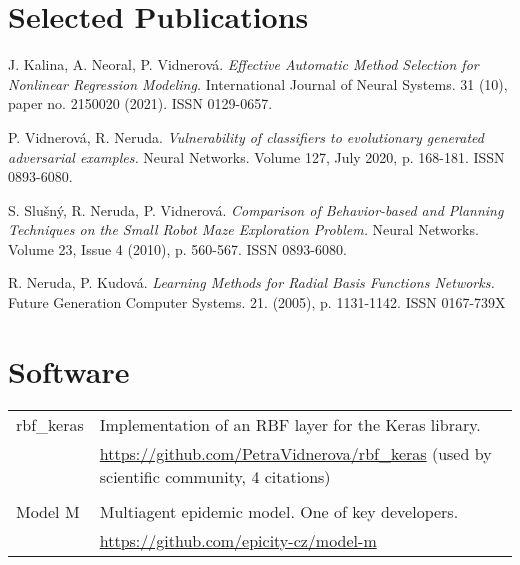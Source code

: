 \documentclass[a4paper, oneside, final]{scrartcl} %
\newcommand{\gray}{\rowcolor[gray]{.90}} %
\begin{document}


 \section{Selected Publications}
 \noindent
J. Kalina, A. Neoral, P. Vidnerová.
{\em Effective Automatic Method Selection for Nonlinear Regression Modeling.}
International Journal of Neural Systems. 31 (10), paper no. 2150020 (2021). ISSN 0129-0657.

\noindent
P. Vidnerov\'a, R. Neruda.  {\em Vulnerability of classifiers to evolutionary
  generated adversarial examples.}  Neural Networks. Volume 127, July 2020,
p. 168-181. ISSN 0893-6080.

\noindent
S. Slu\v{s}n\'y, R. Neruda, P. Vidnerov\'a.  {\em Comparison of
  Behavior-based and Planning Techniques on the Small Robot Maze
  Exploration Problem.}  Neural Networks. Volume 23, Issue 4 (2010),
p. 560-567. ISSN 0893-6080.

\noindent
R. Neruda, P. Kudov\'a.  {\em Learning Methods for Radial Basis
  Functions Networks.}  Future Generation Computer
Systems. 21. (2005), p. 1131-1142. ISSN 0167-739X

\section{Software}
\begin{tabularx}{0.97\linewidth}{>{\raggedleft}p{2cm}X}
\gray  rbf\_keras & Implementation of an RBF layer for the Keras library. \\
   & 
  \href{https://github.com/PetraVidnerova/rbf_keras}{https://github.com/PetraVidnerova/rbf\_keras}
  (used by scientific community, 4 citations)\\
  \\
  \gray Model M & Multiagent epidemic model. One of key developers. \\
  & \href{https://github.com/epicity-cz/model-m}{https://github.com/epicity-cz/model-m} \\
\end{tabularx}
\end{document}
